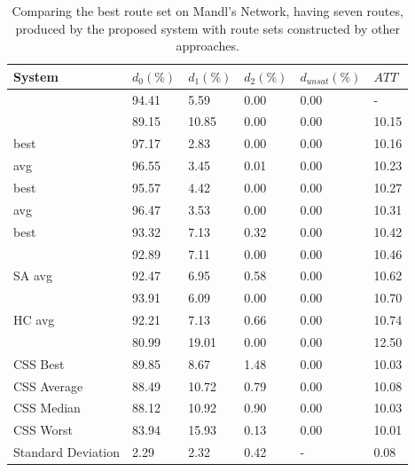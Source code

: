 \begin{table}[H]
    \centering
    \hspace*{-1.0cm}
    \begin{tabular}{|l|l|l|l|l|l|}
    \hline
    \textbf{System} & $d_0(\%)$ & $d_1(\%)$ & $d_2(\%)$ & $d_{unsat}(\%)$ & $ATT$ \\
    \hline
    \citet{nikolic14} & 94.41 & 5.59 & 0.00 & 0.00 & - \\
    \citet{chakroborty02} & 89.15 & 10.85 & 0.00 & 0.00 & 10.15 \\
    \citet{kechagiopoulos14} best & 97.17 & 2.83 & 0.00 & 0.00 & 10.16 \\
    \citet{kechagiopoulos14} avg & 96.55 & 3.45 & 0.01 & 0.00 & 10.23 \\
    \citet{chew12} best & 95.57 & 4.42 & 0.00 & 0.00 & 10.27 \\
    \citet{chew12} avg & 96.47 & 3.53 & 0.00 & 0.00 & 10.31 \\
    \citet{fan10} best & 93.32 & 7.13 & 0.32 & 0.00 & 10.42  \\
    \citet{zhang10} & 92.89 & 7.11 & 0.00 & 0.00 & 10.46 \\
    \citet{fan10} SA avg & 92.47 & 6.95 & 0.58 & 0.00 & 10.62 \\
    \citet{kidwai98} & 93.91 & 6.09 & 0.00 & 0.00 & 10.70 \\
    \citet{fan10} HC avg & 92.21 & 7.13 & 0.66 & 0.00 & 10.74 \\
    \citet{baaj91} & 80.99 & 19.01 & 0.00 & 0.00 & 12.50 \\
    \hline
    CSS Best & 89.85 & 8.67 & 1.48 & 0.00 & 10.03\\
    CSS Average & 88.49 & 10.72 & 0.79 & 0.00 & 10.08\\
    CSS Median & 88.12 & 10.92 & 0.90 & 0.00 & 10.03\\
    CSS Worst & 83.94 & 15.93 & 0.13 & 0.00 & 10.01\\
    Standard Deviation & 2.29 & 2.32 & 0.42 & - & 0.08\\
    \hline
    \end{tabular}
    \caption {Comparing the best route set on Mandl's Network, having seven routes, produced by the proposed system with route sets constructed by other approaches.}
    \label{table:performanceComparison_7}
\end{table}

